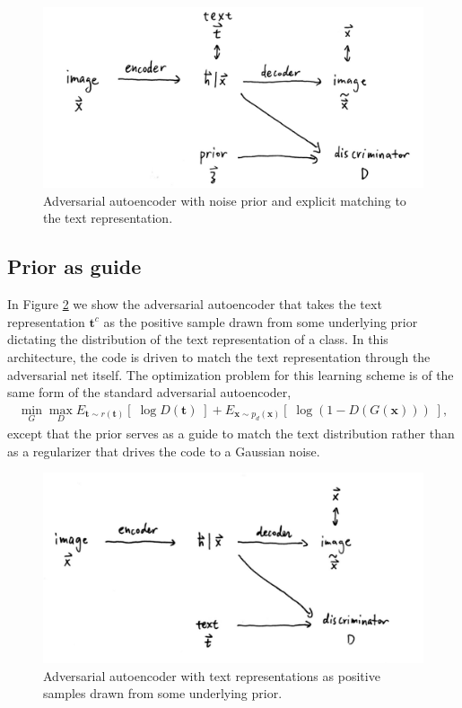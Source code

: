 \documentclass{article}
\newcommand{\bb}[1]{\boldsymbol{#1}}
\begin{document}

\begin{figure}[h]
\centering
\includegraphics[width = 10 cm]{figNoisePrior}
\caption{Adversarial autoencoder with noise prior and explicit matching to the text representation.}
\label{fig:NoisePrior}
\end{figure}








\subsection{Prior as guide}
	
	In Figure \ref{fig:TextPrior} we show the adversarial autoencoder that takes the text representation $\bb{t}^c$ as the positive sample drawn from some underlying prior dictating the distribution of the text representation of a class. In this architecture, the code is driven to match the text representation through the adversarial net itself. The optimization problem for this learning scheme is of the same form of the standard adversarial autoencoder,
	\begin{align}
		\min_{G} \max_D E_{\bb{t} \sim r(\bb{t})}\left[\; \log D(\bb{t}) \;\right] + E_{\bb{x} \sim p_d(\bb{x})}\left[\; \log( 1 - D(G(\bb{x})) ) \;\right],
	\end{align}
	except that the prior serves as a guide to match the text distribution rather than as a regularizer that drives the code to a Gaussian noise.




\begin{figure}[h]
\centering
\includegraphics[width = 10 cm]{figTextPrior}
\caption{Adversarial autoencoder with text representations as positive samples drawn from some underlying prior.}
\label{fig:TextPrior}
\end{figure}
\end{document}

